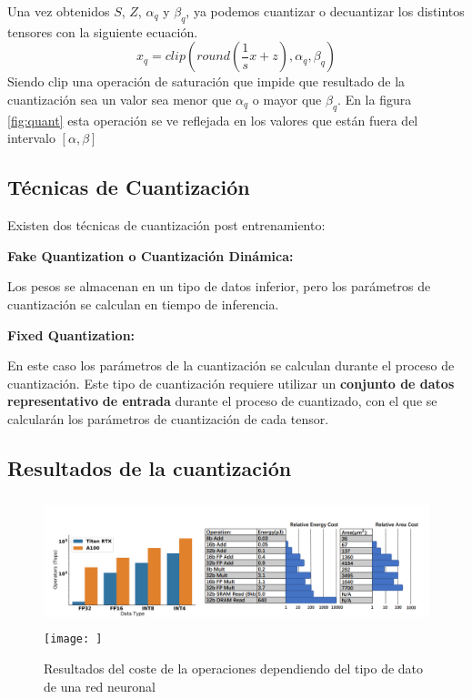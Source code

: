Una vez obtenidos $S$, $Z$, $\alpha_q$ y $\beta_q$, ya podemos cuantizar o decuantizar los distintos tensores con la siguiente ecuación.
$$
x_q = clip(round(\frac{1}{s}x + z), \alpha_q, \beta_q)
$$
Siendo clip una operación de saturación que impide que resultado de la cuantización sea un valor sea menor que $\alpha_q$ o mayor que $\beta_q$.
En la figura \ref{fig:quant} esta operación se ve reflejada en los valores que están fuera del intervalo $[\alpha,\beta]$


\hypertarget{tecnicas-de-cuantizacion}{%
\subsection{\texorpdfstring{Técnicas de Cuantización
}{Técnicas de Cuantización }}\label{tecnicas-de-cuantizacion}}

Existen dos técnicas de cuantización post entrenamiento:

\textbf{Fake Quantization o Cuantización Dinámica:}

Los pesos se almacenan en un tipo de datos inferior, pero los parámetros
de cuantización se calculan en tiempo de inferencia.

\textbf{Fixed Quantization:}

En este caso los parámetros de la cuantización se calculan durante el
proceso de cuantización. Este tipo de cuantización requiere utilizar un
\textbf{conjunto de datos representativo} \textbf{de entrada} durante el
proceso de cuantizado, con el que se calcularán los parámetros de
cuantización de cada tensor.

\hypertarget{resultados-de-la-cuantizaciuxf3n}{%
\subsection{Resultados de la
cuantización}\label{resultados-de-la-cuantizaciuxf3n}}
\begin{figure}
    \centering
    \includegraphics[width=5in,height=1.45833in]{img/3/quant_res.png}
    \texttt{[image: ]}
    \caption{Resultados del coste de la operaciones dependiendo del tipo de dato de una red neuronal}
    \label{fig:quant-res}
\end{figure}

